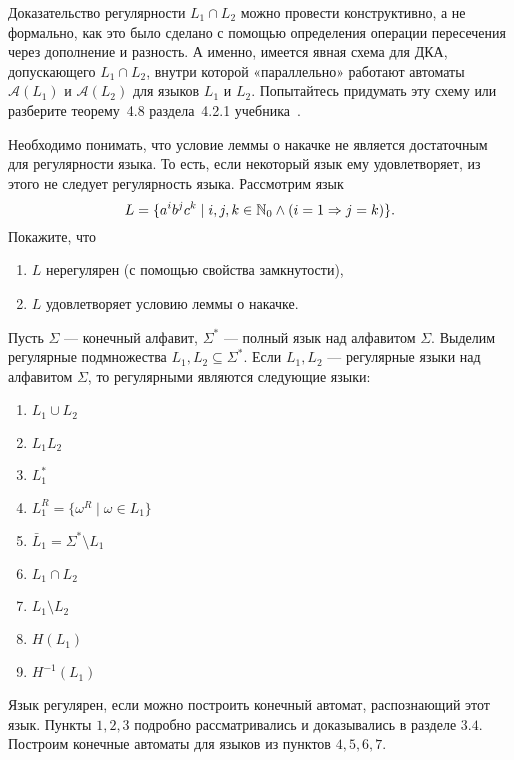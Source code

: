 \begin{myproblem}
Доказательство регулярности $L_1 \cap L_2$ можно провести
конструктивно, а не формально, как это было сделано с помощью
определения операции пересечения через дополнение и разность.
А именно, имеется явная схема для ДКА, допускающего $L_1 \cap L_2$,
внутри которой «параллельно» работают автоматы $\mathcal A(L_1)$
и $\mathcal A(L_2)$ для языков $L_1$ и $L_2$. Попытайтесь придумать эту
схему или разберите теорему~4.8 раздела~4.2.1 учебника~\cite{Hop}.
\end{myproblem}

\begin{myproblem}
Необходимо понимать, что условие леммы о накачке не является
достаточным для регулярности языка. То есть, если
некоторый язык ему удовлетворяет, из этого не следует
регулярность языка. Рассмотрим язык
\[L = \{a^i b^j c^k \mid i, j, k \in \mathbb N_0 \wedge (i=1 \Rightarrow j = k)\}.\]
Покажите, что
\begin{enumerate}
    \item $L$ нерегулярен (с помощью свойства замкнутости),
    \item $L$ удовлетворяет условию леммы о накачке.
\end{enumerate}
\end{myproblem}

Пусть $\Sigma$ --- конечный алфавит, $\Sigma^*$ --- полный язык над алфавитом $\Sigma$. Выделим регулярные подмножества $L_1, L_2 \subseteq \Sigma^*$. Если $L_1, L_2$ --- регулярные языки над алфавитом $\Sigma$, то регулярными являются следующие языки:
\begin{enumerate}
\item $L_1 \cup L_2$
\item $L_1 L_2$
\item $L_1^*$
\item $L_1^R = \{ \omega^R \mid \omega \in L_1 \}$
\item $\bar L_1 = \Sigma^* \setminus L_1$
\item $L_1 \cap L_2$
\item $L_1 \setminus L_2$
\item $H(L_1)$
\item $H^{-1}(L_1)$
\end{enumerate}

Язык регулярен, если можно построить конечный автомат, распознающий этот язык. Пункты $1, 2, 3$ подробно рассматривались и доказывались в разделе $3.4$. Построим конечные автоматы для языков из пунктов $4, 5, 6, 7$.

